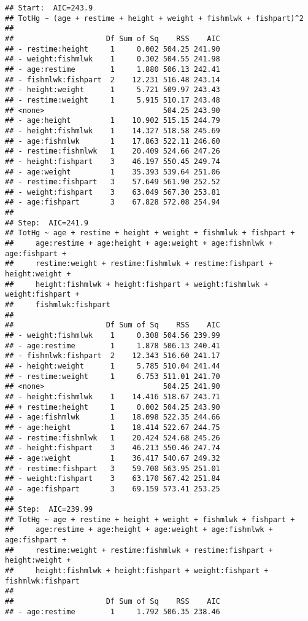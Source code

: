 \documentclass[12pt,]{article}
\begin{document}
\begin{verbatim}
## Start:  AIC=243.9
## TotHg ~ (age + restime + height + weight + fishmlwk + fishpart)^2
## 
##                     Df Sum of Sq    RSS    AIC
## - restime:height     1     0.002 504.25 241.90
## - weight:fishmlwk    1     0.302 504.55 241.98
## - age:restime        1     1.880 506.13 242.41
## - fishmlwk:fishpart  2    12.231 516.48 243.14
## - height:weight      1     5.721 509.97 243.43
## - restime:weight     1     5.915 510.17 243.48
## <none>                           504.25 243.90
## - age:height         1    10.902 515.15 244.79
## - height:fishmlwk    1    14.327 518.58 245.69
## - age:fishmlwk       1    17.863 522.11 246.60
## - restime:fishmlwk   1    20.409 524.66 247.26
## - height:fishpart    3    46.197 550.45 249.74
## - age:weight         1    35.393 539.64 251.06
## - restime:fishpart   3    57.649 561.90 252.52
## - weight:fishpart    3    63.049 567.30 253.81
## - age:fishpart       3    67.828 572.08 254.94
## 
## Step:  AIC=241.9
## TotHg ~ age + restime + height + weight + fishmlwk + fishpart + 
##     age:restime + age:height + age:weight + age:fishmlwk + age:fishpart + 
##     restime:weight + restime:fishmlwk + restime:fishpart + height:weight + 
##     height:fishmlwk + height:fishpart + weight:fishmlwk + weight:fishpart + 
##     fishmlwk:fishpart
## 
##                     Df Sum of Sq    RSS    AIC
## - weight:fishmlwk    1     0.308 504.56 239.99
## - age:restime        1     1.878 506.13 240.41
## - fishmlwk:fishpart  2    12.343 516.60 241.17
## - height:weight      1     5.785 510.04 241.44
## - restime:weight     1     6.753 511.01 241.70
## <none>                           504.25 241.90
## - height:fishmlwk    1    14.416 518.67 243.71
## + restime:height     1     0.002 504.25 243.90
## - age:fishmlwk       1    18.098 522.35 244.66
## - age:height         1    18.414 522.67 244.75
## - restime:fishmlwk   1    20.424 524.68 245.26
## - height:fishpart    3    46.213 550.46 247.74
## - age:weight         1    36.417 540.67 249.32
## - restime:fishpart   3    59.700 563.95 251.01
## - weight:fishpart    3    63.170 567.42 251.84
## - age:fishpart       3    69.159 573.41 253.25
## 
## Step:  AIC=239.99
## TotHg ~ age + restime + height + weight + fishmlwk + fishpart + 
##     age:restime + age:height + age:weight + age:fishmlwk + age:fishpart + 
##     restime:weight + restime:fishmlwk + restime:fishpart + height:weight + 
##     height:fishmlwk + height:fishpart + weight:fishpart + fishmlwk:fishpart
## 
##                     Df Sum of Sq    RSS    AIC
## - age:restime        1     1.792 506.35 238.46

\end{verbatim}
\end{document}
